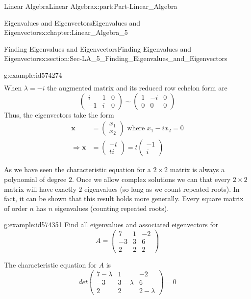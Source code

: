 \documentclass[oneside,10pt,]{book}
\numberwithin{equation}{section}
\newcommand{\amp}{&}
\begin{document}
\begin{partptx}{Linear Algebra}{}{Linear Algebra}{}{}{x:part:Part-Linear_Algebra}
\begin{chapterptx}{Eigenvalues and Eigenvectors}{}{Eigenvalues and Eigenvectors}{}{}{x:chapter:Linear_Algebra_5}
\begin{sectionptx}{Finding Eigenvalues and Eigenvectors}{}{Finding Eigenvalues and Eigenvectors}{}{}{x:section:Sec-LA_5_Finding_Eigenvalues_and_Eigenvectors}
\begin{example}{}{g:example:id574274}
\begin{align*}
\end{align*}
When \(\lambda=-i\) the augmented matrix and its reduced row echelon form are%
\begin{equation*}
\begin{pmatrix} i \amp 1 \amp 0 \\ -1 \amp i \amp 0 \end{pmatrix} \sim \begin{pmatrix} 1 \amp -i \amp 0 \\ 0 \amp 0 \amp 0 \end{pmatrix} 
\end{equation*}
Thus, the eigenvectors take the form%
\begin{align*}
\mathbf{x} \amp =\begin{pmatrix} x_1 \\ x_2 \end{pmatrix} \textrm{ where } x_1-ix_2=0 \\
\Rightarrow \mathbf{x} \amp =\begin{pmatrix} -t \\ ti \end{pmatrix} = t\begin{pmatrix} -1 \\ i \end{pmatrix}
\end{align*}
%
\end{example}
As we have seen the characteristic equation for a \(2\times 2\) matrix is always a polynomial of degree \(2\). Once we allow complex solutions we can that every \(2\times 2\) matrix will have exactly \(2\) eigenvalues (so long as we count repeated roots). In fact, it can be shown that this result holds more generally. Every square matrix of order \(n\) has \(n\) eigenvalues (counting repeated roots).%
\begin{example}{}{g:example:id574351}%
Find all eigenvalues and associated eigenvectors for%
\begin{equation*}
A=\begin{pmatrix} 7 \amp 1 \amp -2 \\ -3 \amp 3 \amp 6 \\ 2 \amp 2\amp 2 \end{pmatrix}
\end{equation*}
%
\par\smallskip%
\noindent\hypertarget{g:solution:id574392}{}The characteristic equation for \(A\) is%
\begin{equation*}
det\begin{pmatrix} 7-\lambda \amp 1 \amp -2 \\ -3 \amp 3-\lambda \amp 6 \\ 2 \amp 2\amp 2-\lambda \end{pmatrix}=0

\end{equation*}
\end{example}
\end{sectionptx}
\end{chapterptx}
\end{partptx}
\end{document}
